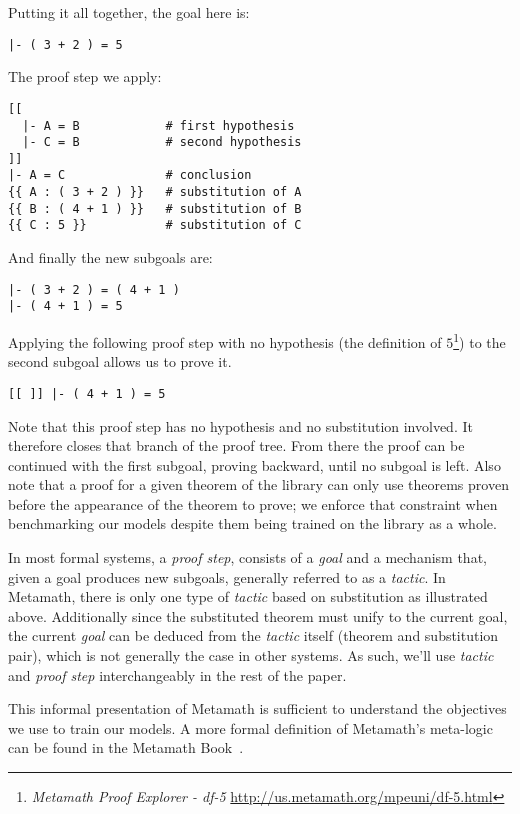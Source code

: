 \documentclass{article}
\begin{document}
Putting it all together, the goal here is:

\begin{verbatim}
|- ( 3 + 2 ) = 5
\end{verbatim}

The proof step we apply:

\begin{verbatim}
[[
  |- A = B            # first hypothesis
  |- C = B            # second hypothesis
]]
|- A = C              # conclusion
{{ A : ( 3 + 2 ) }}   # substitution of A
{{ B : ( 4 + 1 ) }}   # substitution of B
{{ C : 5 }}           # substitution of C
\end{verbatim}

And finally the new subgoals are:

\begin{verbatim}
|- ( 3 + 2 ) = ( 4 + 1 )
|- ( 4 + 1 ) = 5
\end{verbatim}

Applying the following proof step with no hypothesis (the definition of $5$\footnote{\textit{Metamath Proof Explorer - df-5} \url{http://us.metamath.org/mpeuni/df-5.html}}) to the second subgoal allows us to prove it.

\begin{verbatim}
[[ ]] |- ( 4 + 1 ) = 5
\end{verbatim}

Note that this proof step has no hypothesis and no substitution involved. It therefore closes that branch of the proof tree. From there the proof can be continued with the first subgoal, proving backward, until no subgoal is left. Also note that a proof for a given theorem of the library can only use theorems proven before the appearance of the theorem to prove; we enforce that constraint when benchmarking our models despite them being trained on the library as a whole.

In most formal systems, a \textit{proof step}, consists of a \textit{goal} and a mechanism that, given a goal produces new subgoals, generally referred to as a \textit{tactic}. In Metamath, there is only one type of \textit{tactic} based on substitution as illustrated above. Additionally since the substituted theorem must unify to the current goal, the current \textit{goal} can be deduced from the \textit{tactic} itself (theorem and substitution pair), which is not generally the case in other systems. As such, we'll use \textit{tactic} and \textit{proof step} interchangeably in the rest of the paper.

This informal presentation of Metamath is sufficient to understand the objectives we use to train our models. A more formal definition of Metamath's meta-logic can be found in the Metamath Book~\cite{megill2019metamath}.
\end{document}

